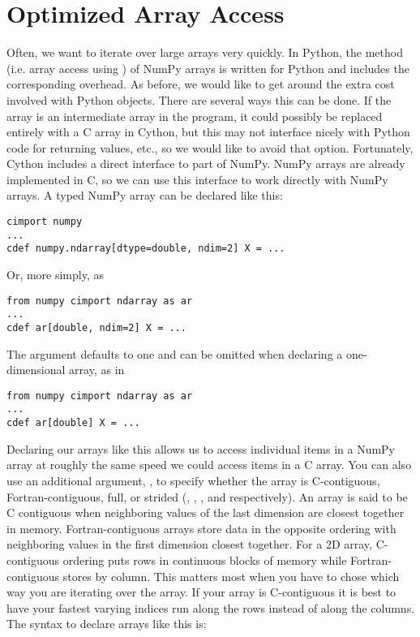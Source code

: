 \section*{Optimized Array Access}
Often, we want to iterate over large arrays very quickly.
In Python, the  method (i.e. array access using \li{[ ]}) of NumPy arrays is written for Python and includes the corresponding overhead.
As before, we would like to get around the extra cost involved with Python objects.
There are several ways this can be done.
If the array is an intermediate array in the program, it could possibly be replaced entirely with a C array in Cython, but this may not interface nicely with Python code for returning values, etc., so we would like to avoid that option.
Fortunately, Cython includes a direct interface to part of NumPy.
NumPy arrays are already implemented in C, so we can use this interface to work directly with NumPy arrays.
A typed NumPy array can be declared like this:
\begin{lstlisting}
cimport numpy
...
cdef numpy.ndarray[dtype=double, ndim=2] X = ...
\end{lstlisting}
Or, more simply, as
\begin{lstlisting}
from numpy cimport ndarray as ar
...
cdef ar[double, ndim=2] X = ...
\end{lstlisting}
The  argument defaults to one and can be omitted when declaring a one-dimensional array, as in
\begin{lstlisting}
from numpy cimport ndarray as ar
...
cdef ar[double] X = ...
\end{lstlisting}
Declaring our arrays like this allows us to access individual items in a NumPy array at roughly the same speed we could access items in a C array.
You can also use an additional argument, , to specify whether the array is C-contiguous, Fortran-contiguous, full, or strided (, , , and  respectively).
An array is said to be C contiguous when neighboring values of the last dimension are closest together in memory.
Fortran-contiguous arrays store data in the opposite ordering with neighboring values in the first dimension closest together.
For a 2D array, C-contiguous ordering puts rows in continuous blocks of memory while Fortran-contiguous stores by column.
This matters most when you have to chose which way you are iterating over the array.
If your array is C-contiguous it is best to have your fastest varying indices run along the rows instead of along the columns.
The syntax to declare arrays like this is:

